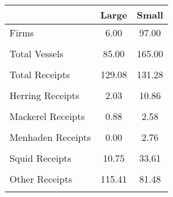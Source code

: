 \begin{tabular}{l*{2}{c}}
\hline\hline
                &    Large&    Small\\
\hline
Firms           &     6.00&    97.00\\
                &         &         \\
Total Vessels   &    85.00&   165.00\\
                &         &         \\
Total Receipts  &   129.08&   131.28\\
                &         &         \\
Herring Receipts&     2.03&    10.86\\
                &         &         \\
Mackerel Receipts&     0.88&     2.58\\
                &         &         \\
Menhaden Receipts&     0.00&     2.76\\
                &         &         \\
Squid Receipts  &    10.75&    33.61\\
                &         &         \\
Other Receipts  &   115.41&    81.48\\
                &         &         \\
\hline\hline
\end{tabular}
